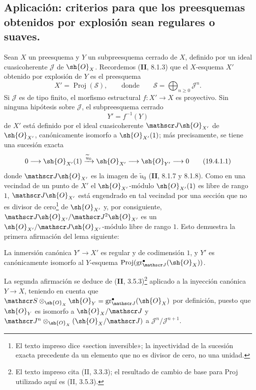 \subsection{Aplicación: criterios para que los preesquemas obtenidos por explosión sean regulares o suaves.}
\label{subsection:IV.19.4}


\begin{env}[19.4.1]
\label{IV.19.4.1}
Sean $X$ un preesquema y $Y$ un subpreesquema cerrado de $X$, definido por un ideal cuasicoherente $\mathscr J$ de $\sh{O}_X$. Recordemos (\textbf{II}, 8.1.3) que el $X$-esquema $X'$ obtenido por explosión de $Y$ es el preesquema
\[
  X'=\operatorname{Proj}(\mathscr S),\qquad\text{donde}\qquad \mathscr S=\bigoplus_{n\geq0}\mathscr J^n.
\]
Si $\mathscr J$ es de tipo finito, el morfismo estructural $f:X'\to X$ es proyectivo. Sin ninguna hipótesis sobre $\mathscr J$, el subpreesquema cerrado
\[
  Y'=f^{-1}(Y)
\]
de $X'$ está definido por el ideal cuasicoherente $\mathscr J\sh{O}_{X'}$ de $\sh{O}_{X'}$, canónicamente isomorfo a $\sh{O}_{X'}(1)$; más precisamente, se tiene una sucesión exacta
\begin{equation}
  0\longrightarrow\sh{O}_{X'}(1)\xrightarrow{\widetilde u_0}\sh{O}_{X'}\longrightarrow\sh{O}_{Y'}\longrightarrow0
  \tag{19.4.1.1}\label{IV.19.4.1.1}
\end{equation}
donde $\mathscr J\sh{O}_{X'}$ es la imagen de $\widetilde u_0$ (\textbf{II}, 8.1.7 y 8.1.8). Como en una vecindad de un punto de $X'$ el $\sh{O}_{X'}$-módulo $\sh{O}_{X'}(1)$ es libre de rango $1$, $\mathscr J\sh{O}_{X'}$ está engendrado en tal vecindad por una sección que no es divisor de cero\footnote{El texto impreso dice «section inversible»; la inyectividad de la sucesión exacta precedente da un elemento que no es divisor de cero, no una unidad.} de $\sh{O}_{X'}$ y, por consiguiente, $\mathscr J\sh{O}_{X'}/\mathscr J^2\sh{O}_{X'}$ es un $\sh{O}_{X'}/\mathscr J\sh{O}_{X'}$-módulo libre de rango $1$. Esto demuestra la primera afirmación del lema siguiente:
\end{env}

\begin{lemma}[19.4.2]
\label{IV.19.4.2}
La inmersión canónica $Y'\to X'$ es regular y de codimensión $1$, y $Y'$ es canónicamente isomorfo al $Y$-esquema $\operatorname{Proj}(\operatorname{gr}_{\mathscr J}^\bullet(\sh{O}_X))$.
\end{lemma}

La segunda afirmación se deduce de (\textbf{II}, 3.5.3)\footnote{El texto impreso cita (II, 3.3.3); el resultado de cambio de base para Proj utilizado aquí es (II, 3.5.3).} aplicado a la inyección canónica $Y\to X$, teniendo en cuenta que $\mathscr S\otimes_{\sh{O}_X}\sh{O}_Y=\operatorname{gr}_{\mathscr J}^\bullet(\sh{O}_X)$ por definición, puesto que $\sh{O}_Y$ es isomorfo a $\sh{O}_X/\mathscr J$ y $\mathscr J^n\otimes_{\sh{O}_X}(\sh{O}_X/\mathscr J)$ a $\mathscr J^n/\mathscr J^{n+1}$.

